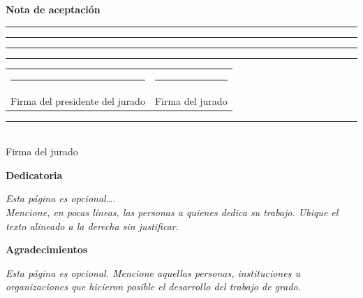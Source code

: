 \documentclass[12pt, letterpaper]{article}
\begin{document}
\newpage
\thispagestyle{empty}
\begin{center}
    \vspace*{3cm}
    {\large \bfseries Nota de aceptación\par}
    \vspace{2cm}
    \rule{15cm}{0.4pt}
    \rule{15cm}{0.4pt}
    \rule{15cm}{0.4pt}
    \rule{15cm}{0.4pt}
    \vspace{4cm}
\end{center}
\begin{flushleft}
    \large
    \begin{tabular}{p{7cm}p{7cm}}
        \rule{7cm}{0.4pt} & \rule{7cm}{0.4pt} \\
        Firma del presidente del jurado & Firma del jurado \\
    \end{tabular}
    \vspace{2cm}
    \begin{center}
        \rule{7cm}{0.4pt}\\
        Firma del jurado
    \end{center}
\end{flushleft}

\newpage
\thispagestyle{empty}
\begin{flushright}
    \vspace*{3cm}
    {\large \bfseries Dedicatoria\par}
    \vspace{2cm}
    \textit{Esta página es opcional….\\
    Mencione, en pocas líneas, las personas a quienes dedica su trabajo. Ubique el texto alineado a la derecha sin justificar.}
\end{flushright}

\newpage
\thispagestyle{empty}
\begin{center}
    \vspace*{3cm}
    {\large \bfseries Agradecimientos\par}
    \vspace{2cm}
    \textit{Esta página es opcional. Mencione aquellas personas, instituciones u organizaciones que hicieron posible el desarrollo del trabajo de grado.}
\end{center}
\end{document}
